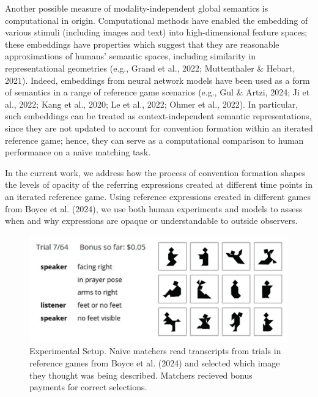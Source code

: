 \documentclass[10pt, letterpaper]{article}
\begin{document}
Another possible measure of modality-independent global semantics is
computational in origin. Computational methods have enabled the
embedding of various stimuli (including images and text) into
high-dimensional feature spaces; these embeddings have properties which
suggest that they are reasonable approximations of humans' semantic
spaces, including similarity in representational geometries (e.g., Grand
et al., 2022; Muttenthaler \& Hebart, 2021). Indeed, embeddings from
neural network models have been used as a form of semantics in a range
of reference game scenarios (e.g., Gul \& Artzi, 2024; Ji et al., 2022;
Kang et al., 2020; Le et al., 2022; Ohmer et al., 2022). In particular,
such embeddings can be treated as context-independent semantic
representations, since they are not updated to account for convention
formation within an iterated reference game; hence, they can serve as a
computational comparison to human performance on a naïve matching task.

In the current work, we address how the process of convention formation
shapes the levels of opacity of the referring expressions created at
different time points in an iterated reference game. Using reference
expressions created in different games from Boyce et al. (2024), we use
both human experiments and models to assess when and why expressions are
opaque or understandable to outside observers.

\begin{CodeChunk}
\begin{figure}[t!]

{\centering \includegraphics[width=1\linewidth]{matcher-diagram} 

}

\caption[Experimental Setup]{Experimental Setup. Naive matchers read transcripts from trials in reference games from Boyce et al. (2024) and selected which image they thought was being described. Matchers recieved bonus payments for correct selections. \label{game}}\label{fig:interface}
\end{figure}
\end{CodeChunk}
\end{document}
